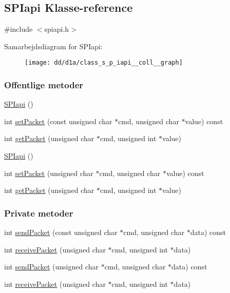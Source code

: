\hypertarget{class_s_p_iapi}{}\subsection{S\+P\+Iapi Klasse-\/reference}
\label{class_s_p_iapi}


{\ttfamily \#include $<$spiapi.\+h$>$}



Samarbejdsdiagram for S\+P\+Iapi\+:
\nopagebreak
\begin{figure}[H]
\begin{center}
\leavevmode
\texttt{[image: dd/d1a/class\_s\_p\_iapi\_\_coll\_\_graph]}
\end{center}
\end{figure}
\subsubsection*{Offentlige metoder}
\begin{DoxyCompactItemize}
\item 
\hyperlink{class_s_p_iapi_ae0ce1f581babcf0dab1d0559a352d514}{S\+P\+Iapi} ()
\item 
int \hyperlink{class_s_p_iapi_a197b3f71fa8f68516260bcb3b6985c6b}{set\+Packet} (const unsigned char $\ast$cmd, unsigned char $\ast$value) const 
\item 
int \hyperlink{class_s_p_iapi_afce62b978fa58c0ccefe336835cda0bb}{get\+Packet} (unsigned char $\ast$cmd, unsigned int $\ast$value)
\item 
\hyperlink{class_s_p_iapi_ae0ce1f581babcf0dab1d0559a352d514}{S\+P\+Iapi} ()
\item 
int \hyperlink{class_s_p_iapi_ad5902c2fbc9a0b0a4c807b9da5197fcf}{set\+Packet} (unsigned char $\ast$cmd, unsigned char $\ast$value) const 
\item 
int \hyperlink{class_s_p_iapi_afce62b978fa58c0ccefe336835cda0bb}{get\+Packet} (unsigned char $\ast$cmd, unsigned int $\ast$value)
\end{DoxyCompactItemize}
\subsubsection*{Private metoder}
\begin{DoxyCompactItemize}
\item 
int \hyperlink{class_s_p_iapi_aeeb857d3584d80daa2588a4d971b248e}{send\+Packet} (const unsigned char $\ast$cmd, unsigned char $\ast$data) const 
\item 
int \hyperlink{class_s_p_iapi_a65cbe59b0788556afcfdcac59de1752a}{receive\+Packet} (unsigned char $\ast$cmd, unsigned int $\ast$data)
\item 
int \hyperlink{class_s_p_iapi_a8159ee4c56139354ea1302bb64b99a2d}{send\+Packet} (unsigned char $\ast$cmd, unsigned char $\ast$data) const 
\item 
int \hyperlink{class_s_p_iapi_a65cbe59b0788556afcfdcac59de1752a}{receive\+Packet} (unsigned char $\ast$cmd, unsigned int $\ast$data)
\end{DoxyCompactItemize}


